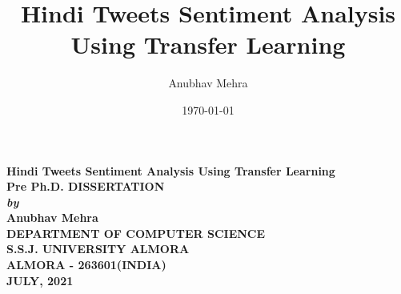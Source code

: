 \documentclass[a4paper, 12pt]{article}
\title{Hindi Tweets Sentiment Analysis Using Transfer Learning}
\author{Anubhav Mehra}
\date{\today}
\begin{document}
\begin{titlepage}
	\begin{center}
		\vspace*{1cm}
			\Large{\textbf{Hindi Tweets Sentiment Analysis Using Transfer Learning}}\\
			\vspace*{3cm}
			\large{\textbf{Pre Ph.D. DISSERTATION}}\\
			\vspace*{3cm}
			\large{\textit{\textbf{by}}} \\
			\vspace*{3cm}
			\large{\textbf{Anubhav Mehra}}\\
			\vfill
			\Large{\textbf{DEPARTMENT OF COMPUTER SCIENCE \\ S.S.J. UNIVERSITY ALMORA \\ ALMORA - 263601(INDIA) \\ JULY, 2021}}
			
			
			
	\end{center}
\end{titlepage}
\end{document}
